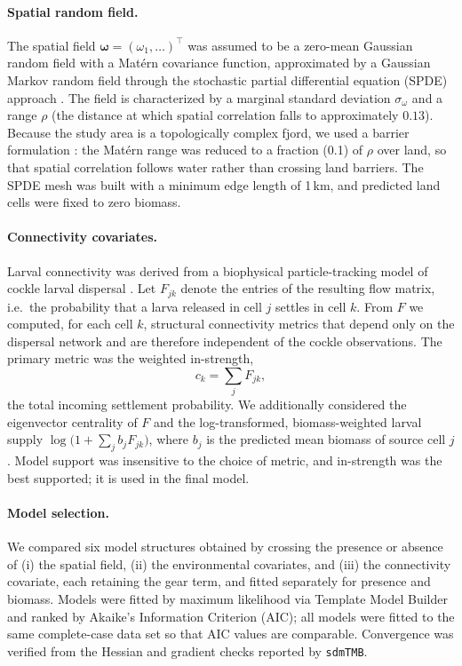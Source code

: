 \paragraph{Spatial random field.}
The spatial field $\boldsymbol{\omega}=(\omega_1,\dots)^\top$ was assumed to be a
zero-mean Gaussian random field with a Mat\'ern covariance function,
approximated by a Gaussian Markov random field through the stochastic partial
differential equation (SPDE) approach \citep{lindgren2011}. The field is
characterized by a marginal standard deviation $\sigma_\omega$ and a range
$\rho$ (the distance at which spatial correlation falls to approximately
$0.13$). Because the study area is a topologically complex fjord, we used a
barrier formulation \citep{bakka2019}: the Mat\'ern range was reduced to a
fraction (0.1) of $\rho$ over land, so that spatial correlation follows water
rather than crossing land barriers. The SPDE mesh was built with a minimum edge
length of 1\,km, and predicted land cells were fixed to zero biomass.

\paragraph{Connectivity covariates.}
Larval connectivity was derived from a biophysical particle-tracking model of
cockle larval dispersal \citep{yourABMref}. Let $F_{jk}$ denote the entries of
the resulting flow matrix, i.e.\ the probability that a larva released in cell
$j$ settles in cell $k$. From $F$ we computed, for each cell $k$, structural
connectivity metrics that depend only on the dispersal network and are therefore
independent of the cockle observations. The primary metric was the weighted
in-strength,
\begin{equation}
c_k = \sum_{j} F_{jk},
\end{equation}
the total incoming settlement probability. We additionally considered the
eigenvector centrality of $F$ and the log-transformed, biomass-weighted larval
supply $\log\!\big(1+\sum_j b_j F_{jk}\big)$, where $b_j$ is the predicted mean
biomass of source cell $j$. Model support was insensitive to the choice of
metric, and in-strength was the best supported; it is used in the final model.

\paragraph{Model selection.}
We compared six model structures obtained by crossing the presence or absence of
(i) the spatial field, (ii) the environmental covariates, and (iii) the
connectivity covariate, each retaining the gear term, and fitted separately for
presence and biomass. Models were fitted by maximum likelihood via Template
Model Builder \citep{kristensen2016} and ranked by Akaike's Information
Criterion (AIC); all models were fitted to the same complete-case data set so
that AIC values are comparable. Convergence was verified from the Hessian and
gradient checks reported by \texttt{sdmTMB}.

